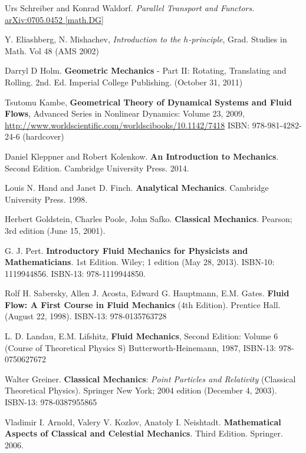 \documentclass[10pt]{amsart}
\begin{document}
\begin{thebibliography}{9}
Urs Schreiber and Konrad Waldorf.  \emph{Parallel Transport and Functors}.  \href{https://arxiv.org/pdf/0705.0452.pdf}{arXiv:0705.0452 [math.DG]}

Y. Eliashberg, N. Mishachev, \emph{Introduction to the $h$-principle}, Grad. Studies in Math. Vol 48 (AMS 2002)

Darryl D Holm. \textbf{Geometric Mechanics} - Part II: Rotating, Translating and Rolling. 2nd. Ed. Imperial College Publishing. (October 31, 2011) 

Tsutomu Kambe, \textbf{Geometrical Theory of Dynamical Systems and Fluid Flows}, Advanced Series in Nonlinear Dynamics: Volume 23, 2009, \url{http://www.worldscientific.com/worldscibooks/10.1142/7418} ISBN: 978-981-4282-24-6 (hardcover)

Daniel Kleppner and Robert Kolenkow. \textbf{An Introduction to Mechanics}. Second Edition. Cambridge University Press. 2014.

Louis N. Hand and Janet D. Finch. \textbf{Analytical Mechanics}. Cambridge University Press. 1998. 

Herbert Goldstein, Charles Poole, John Safko. \textbf{Classical Mechanics}. Pearson; 3rd edition (June 15, 2001).

G. J. Pert. \textbf{Introductory Fluid Mechanics for Physicists and Mathematicians}. 1st Edition. Wiley; 1 edition (May 28, 2013). ISBN-10: 1119944856. ISBN-13: 978-1119944850. 

Rolf H. Sabersky, Allen J. Acosta, Edward G. Hauptmann, E.M. Gates.  \textbf{Fluid Flow: A First Course in Fluid Mechanics} (4th Edition).  Prentice Hall. (August 22, 1998).  ISBN-13: 978-0135763728

L. D. Landau, E.M. Lifshitz, \textbf{Fluid Mechanics}, Second Edition: Volume 6 (Course of Theoretical Physics S) Butterworth-Heinemann, 1987, ISBN-13: 978-0750627672


Walter Greiner. \textbf{Classical Mechanics}: \emph{Point Particles and Relativity} (Classical Theoretical Physics). Springer New York; 2004 edition (December 4, 2003). ISBN-13: 978-0387955865

Vladimir I. Arnold, Valery V. Kozlov, Anatoly I. Neishtadt.  \textbf{Mathematical Aspects of Classical and Celestial Mechanics}.  Third Edition.  Springer. 2006.  


\end{thebibliography}
\end{document}

